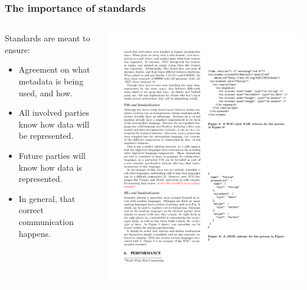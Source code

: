 \documentclass{beamer}
\begin{document}
\begin{frame}
  \frametitle{The importance of standards}
  \begin{columns}
  \begin{column}{0.6\textwidth}
  Standards are meant to ensure:
  \begin{itemize}
  	\item Agreement on what metadata is being used, and how.
	\item All involved parties know how data will be represented.
	\item Future parties will know how data is represented.
	\item In general, that correct communication happens.
  \end{itemize}
  \end{column}

  \begin{column}{0.5\textwidth}
    \includegraphics[scale=0.9]{graphics/JSONSchema.pdf}
  \end{column}
  \end{columns}
\end{frame}
\end{document}
